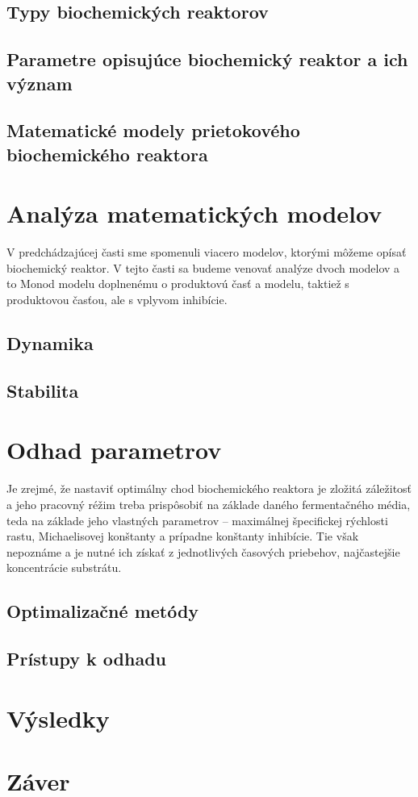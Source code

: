 \documentclass[fleqn]{article}
\begin{document}
\subsection{Typy biochemických reaktorov}


\subsection{Parametre opisujúce biochemický reaktor a ich význam}


\subsection{Matematické modely prietokového biochemického reaktora}


\section{Analýza matematických modelov}
V predchádzajúcej časti sme spomenuli viacero modelov, ktorými môžeme opísať biochemický reaktor. V tejto časti sa budeme venovať analýze dvoch modelov a to Monod modelu doplnenému o produktovú časť a modelu, taktiež s produktovou časťou, ale s vplyvom inhibície.

\subsection{Dynamika}


\subsection{Stabilita}


\section{Odhad parametrov}
Je zrejmé, že nastaviť optimálny chod biochemického reaktora je zložitá záležitosť a jeho pracovný réžim treba prispôsobiť na základe daného fermentačného média, teda na základe jeho vlastných parametrov -- maximálnej špecifickej rýchlosti rastu, Michaelisovej konštanty a prípadne konštanty inhibície. Tie však nepoznáme a je nutné ich získať z jednotlivých časových priebehov, najčastejšie koncentrácie substrátu.

\subsection{Optimalizačné metódy}


\subsection{Prístupy k odhadu}


\section{Výsledky}


\section{Záver}


\newpage


\end{document}
